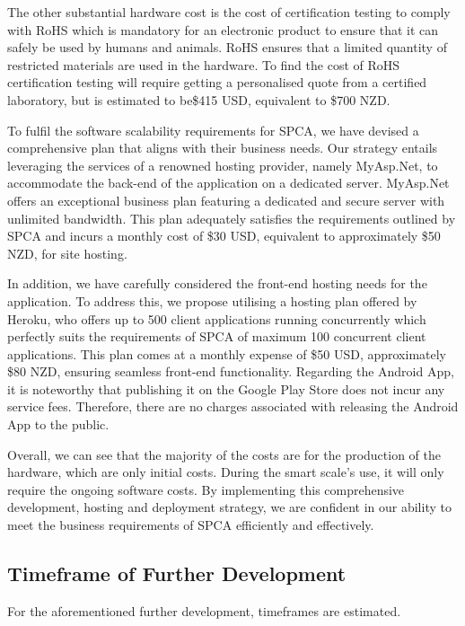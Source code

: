The other substantial hardware cost is the cost of certification testing to comply with RoHS which is mandatory for an electronic product to ensure that it can safely be used by humans and animals. RoHS ensures that a limited quantity of restricted materials are used in the hardware. To find the cost of RoHS certification testing will require getting a personalised quote from a certified laboratory, but is estimated to be\$415 USD, equivalent to \$700 NZD.

To fulfil the software scalability requirements for SPCA, we have devised a comprehensive plan that aligns with their business needs. Our strategy entails leveraging the services of a renowned hosting provider, namely MyAsp.Net, to accommodate the back-end of the application on a dedicated server. MyAsp.Net offers an exceptional business plan featuring a dedicated and secure server with unlimited bandwidth. This plan adequately satisfies the requirements outlined by SPCA and incurs a monthly cost of \$30 USD, equivalent to approximately \$50 NZD, for site hosting.

In addition, we have carefully considered the front-end hosting needs for the application. To address this, we propose utilising a hosting plan offered by Heroku, who offers up to 500 client applications running concurrently which perfectly suits the requirements of SPCA of maximum 100 concurrent client applications. This plan comes at a monthly expense of \$50 USD, approximately \$80 NZD, ensuring seamless front-end functionality.
Regarding the Android App, it is noteworthy that publishing it on the Google Play Store does not incur any service fees. Therefore, there are no charges associated with releasing the Android App to the public. 

Overall, we can see that the majority of the costs are for the production of the hardware, which are only initial costs. During the smart scale’s use, it will only require the ongoing software costs. By implementing this comprehensive development, hosting and deployment strategy, we are confident in our ability to meet the business requirements of SPCA efficiently and effectively.

\subsection{Timeframe of Further Development}

For the aforementioned further development, timeframes are estimated.

